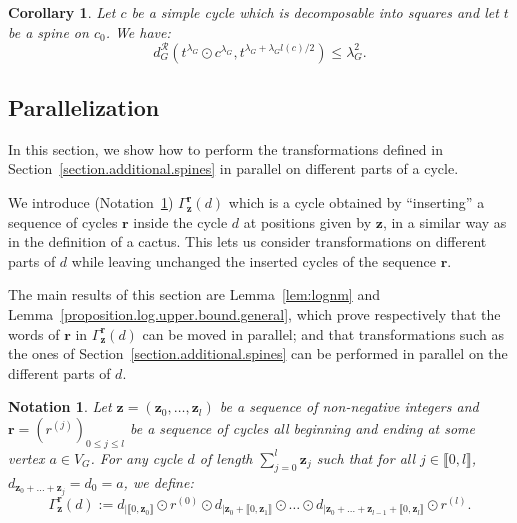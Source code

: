 \documentclass{article}
\newtheorem{corollary}[theorem]{Corollary}
\newtheorem{notation}[theorem]{Notation}
\begin{document}
\begin{corollary}\label{cor:reduction2m}
Let $c$ be a simple cycle which is decomposable into squares and let $t$ be a spine on $c_0$. We have:
\[
	d^{\mathcal{R}}_G(t^{\lambda_G} \odot c^{\lambda_G}, t^{\lambda_G + \lambda_G l(c)/2})\le \lambda_G ^2.
\]
\end{corollary}

\subsection{Parallelization\label{section.spine.parallelisation}}

In this section, we show how to perform the transformations defined in Section~\ref{section.additional.spines} in parallel on different parts of a cycle\textit{}. 

We introduce (Notation~\ref{notation.gamma}) $\Gamma^{\textbf{r}}_{\textbf{z}} (d)$ which is a cycle obtained by ``inserting'' a sequence of cycles $\textbf{r}$ inside the cycle $d$ at positions given by $\textbf{z}$, in a similar way as in the definition of a cactus. This lets us consider transformations on different parts of $d$ while leaving unchanged the inserted cycles of the sequence $\textbf{r}$.

The main results of this section are Lemma~\ref{lem:lognm} and Lemma~\ref{proposition.log.upper.bound.general}, which prove respectively that the words of $\textbf{r}$ in  $\Gamma^{\textbf{r}}_{\textbf{z}}(d)$ can be moved in parallel; and that transformations such as the ones of Section~\ref{section.additional.spines} can be performed in parallel on the different parts of $d$. 

\begin{notation}\label{notation.gamma}
Let $\textbf{z} = (\textbf{z}_0, \dots , \textbf{z}_l)$ be a sequence of non-negative integers and $\textbf{r}=(r^{(j)})_{0 \le j \le l}$ be a sequence of cycles all beginning and ending at some vertex $a\in V_G$. For any cycle $d$ of length $\sum_{j=0}^l \textbf{z}_j$ such that for all $j \in \llbracket 0,l\rrbracket$, $d_{\textbf{z}_0 + \ldots + \textbf{z}_j} = d_0 = a$, we define:
\[
\Gamma^{\textbf{r}}_{\textbf{z}}(d) := d_{|\llbracket 0, \textbf{z}_0 \rrbracket} \odot r^{(0)} \odot d_{|\textbf{z}_0 + \llbracket 0, \textbf{z}_1\rrbracket} \odot \hdots \odot d_{| \textbf{z}_0 + \ldots +\textbf{z}_{l-1}+\llbracket 0 , \textbf{z}_{l}\rrbracket} \odot r^{(l)}.
\]
\end{notation}
\end{document}
